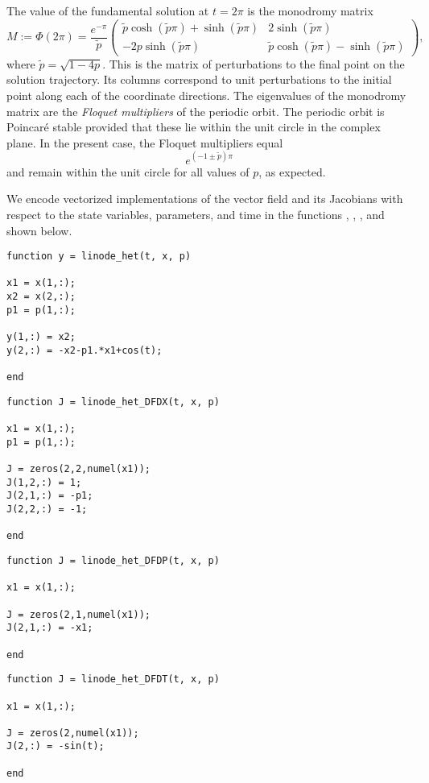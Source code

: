The value of the fundamental solution at $t=2\pi$ is the monodromy matrix
\begin{equation}
M:=\Phi(2\pi)=\frac{e^{-\pi}}{\tilde{p}}\left(\begin{array}{cc}\tilde{p}\cosh(\tilde{p}\pi)+\sinh(\tilde{p}\pi) & 2\sinh(\tilde{p}\pi)\\-2p\sinh(\tilde{p}\pi) & \tilde{p}\cosh(\tilde{p}\pi)-\sinh(\tilde{p}\pi)\end{array}\right),
\end{equation}
where $\tilde{p}=\sqrt{1-4p}$. This is the matrix of perturbations to the final point on the solution trajectory. Its columns correspond to unit perturbations to the initial point along each of the coordinate directions. The eigenvalues of the monodromy matrix are the \emph{Floquet multipliers} of the periodic orbit. The periodic orbit is Poincar\'{e} stable provided that these lie within the unit circle in the complex plane. In the present case, the Floquet multipliers equal
\begin{equation}
e^{(-1\pm\tilde{p})\pi}
\end{equation}
and remain within the unit circle for all values of $p$, as expected.

We encode vectorized implementations of the vector field and its Jacobians with respect to the state variables, parameters, and time in the functions , , , and  shown below.
\begin{lstlisting}[language=coco-highlight]
function y = linode_het(t, x, p)

x1 = x(1,:);
x2 = x(2,:);
p1 = p(1,:);

y(1,:) = x2;
y(2,:) = -x2-p1.*x1+cos(t);

end
\end{lstlisting}
\begin{lstlisting}[language=coco-highlight]
function J = linode_het_DFDX(t, x, p)

x1 = x(1,:);
p1 = p(1,:);

J = zeros(2,2,numel(x1));
J(1,2,:) = 1;
J(2,1,:) = -p1;
J(2,2,:) = -1;

end
\end{lstlisting}
\begin{lstlisting}[language=coco-highlight]
function J = linode_het_DFDP(t, x, p)

x1 = x(1,:);

J = zeros(2,1,numel(x1));
J(2,1,:) = -x1;

end
\end{lstlisting}
\begin{lstlisting}[language=coco-highlight]
function J = linode_het_DFDT(t, x, p)

x1 = x(1,:);

J = zeros(2,numel(x1));
J(2,:) = -sin(t);

end
\end{lstlisting}

